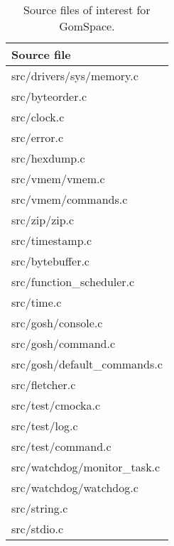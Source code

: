 
\begin{table}[h]
\scriptsize
\centering
\caption{Source files of interest for GomSpace.}
\label{table:interesting}
\begin{tabular}{l}
\hline
\textbf{Source file}\\
\hline
src/drivers/sys/memory.c\\
src/byteorder.c\\
src/clock.c\\
src/error.c\\
src/hexdump.c\\
src/vmem/vmem.c\\
src/vmem/commands.c\\
src/zip/zip.c\\
src/timestamp.c\\
src/bytebuffer.c\\
src/function\_scheduler.c\\
src/time.c\\
src/gosh/console.c\\
src/gosh/command.c\\
src/gosh/default\_commands.c\\
src/fletcher.c\\
src/test/cmocka.c\\
src/test/log.c\\
src/test/command.c\\
src/watchdog/monitor\_task.c\\
src/watchdog/watchdog.c\\
src/string.c\\
src/stdio.c\\
\hline
\end{tabular}
\end{table}